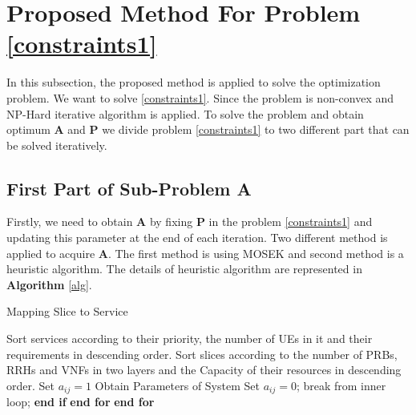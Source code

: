 \documentclass[conference]{IEEEtran}
\begin{document}
\section{Proposed Method For Problem \eqref{constraints1}}
In this subsection, the proposed method is applied to solve the optimization problem.
We want to solve \eqref{constraints1}. Since the problem is non-convex and NP-Hard iterative algorithm is applied.
To solve the problem and obtain optimum $\boldsymbol{A}$ and $\boldsymbol{P}$ we divide problem \eqref{constraints1} to 
two different part that can be solved iteratively.  
\subsection{First Part of Sub-Problem A}\label{firstsub}
Firstly, we need to obtain $\boldsymbol{A}$ by fixing $\boldsymbol{P}$ in the problem \eqref{constraints1} and updating this parameter at the end of each iteration. Two different method is applied to acquire $\boldsymbol{A}$. The first method is using MOSEK and second method is a heuristic algorithm.
The details of heuristic algorithm are represented in \textbf{Algorithm} \eqref{alg}.  
\begin{algorithm}
\caption{Mapping Slice to Service}\label{alg}
\begin{algorithmic}[1]
\State Sort services according to their priority, the number of UEs in it and their requirements in descending order.
\State Sort slices according to the number of PRBs, RRHs and VNFs in two layers and the Capacity of their resources in descending order. 
\State Set $a_{ij} = 1$
\State Obtain Parameters of System
\State Set $a_{ij} = 0$;
\Else
\State break from inner loop;
\EndIf 
\State \textbf{end if}
\EndFor 
\State \textbf{end for}
\EndFor 
\State \textbf{end for}
\end{algorithmic}
\end{algorithm}
\end{document}
